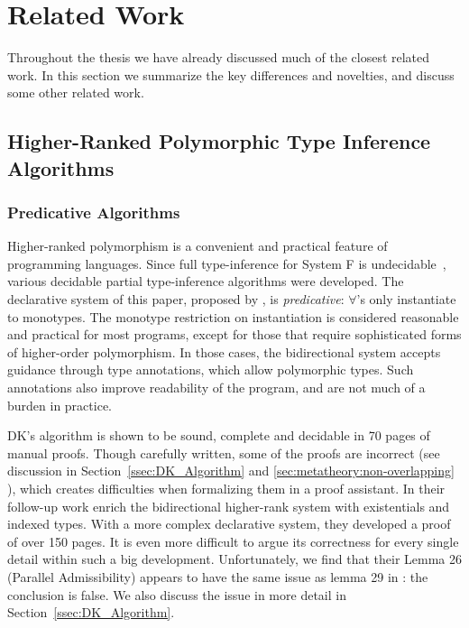 \chapter{Related Work}
\label{chap:related}

Throughout the thesis we have already discussed much of the closest related work.
In this section we summarize the key differences and novelties,
and discuss some other related work.

\section{Higher-Ranked Polymorphic Type Inference Algorithms}

\subsection{Predicative Algorithms}

Higher-ranked polymorphism is a convenient and practical feature of
programming languages.  Since full type-inference for System F is
undecidable~\citep{wells1999typability}, various decidable partial
type-inference algorithms were developed.
The declarative system of this paper,
proposed by \citet{dunfield2013complete}, is \emph{predicative}: 
$\forall$'s only instantiate to monotypes.  The monotype restriction
on instantiation is considered reasonable and practical for most
programs, except for those that require sophisticated forms of
higher-order polymorphism.  In those cases, the bidirectional system
accepts guidance through type annotations, which allow polymorphic types.
Such annotations also improve
readability of the program, and are not much of a burden in practice.

DK's algorithm is shown to be sound, complete and decidable in 70 pages of manual proofs.
Though carefully written, some of the proofs are incorrect
(see discussion in Section~\ref{ssec:DK_Algorithm} and \ref{sec:metatheory:non-overlapping}
),
which creates difficulties when formalizing them in a proof assistant.
In their follow-up work \citep{DunfieldIndexed} enrich the bidirectional higher-rank system with
existentials and indexed types.
With a more complex declarative system, they developed a proof of over 150 pages.
It is even more difficult to argue its correctness for every single detail
within such a big development.
Unfortunately, we find that their Lemma 26 (Parallel Admissibility) appears to have the same issue 
as lemma 29 in \citep{dunfield2013complete}: the conclusion is false. We also discuss
the issue in more detail in Section~\ref{ssec:DK_Algorithm}.

